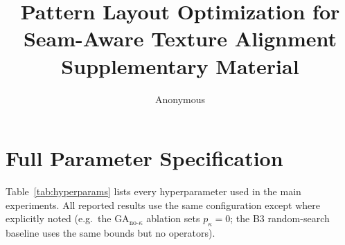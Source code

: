 \documentclass[runningheads]{llncs}
\begin{document}
\title{Pattern Layout Optimization for Seam-Aware Texture Alignment \\
       Supplementary Material}

\author{Anonymous}

\maketitle

\section{Full Parameter Specification}
\label{sup:params}

Table~\ref{tab:hyperparams} lists every hyperparameter used in the main
experiments. All reported results use the same configuration except
where explicitly noted (e.g.\ the $\text{GA}_{\text{no-}\kappa}$
ablation sets $p_\kappa = 0$; the B3 random-search baseline uses the
same bounds but no operators).
\end{document}
